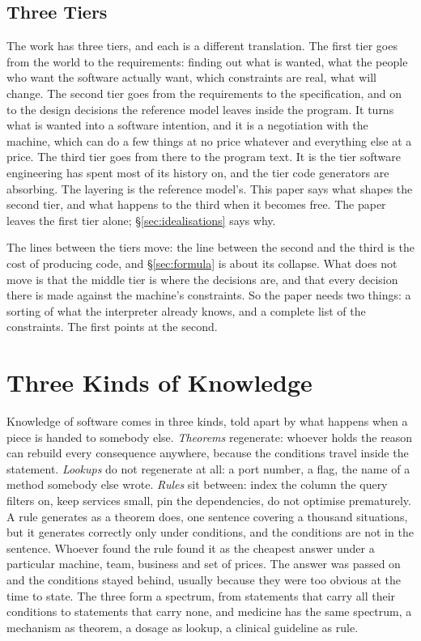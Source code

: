 \documentclass[11pt,oneside]{article}
\theoremstyle{definition}
\theoremstyle{remark}
\begin{document}
\subsection{Three Tiers}\label{sec:tiers}

The work has three tiers, and each is a different translation. The first tier goes from
the world to the requirements: finding out what is wanted, what the people who want the
software actually want, which constraints are real, what will change. The second tier goes
from the requirements to the specification, and on to the design decisions the reference
model leaves inside the program. It turns what is wanted into a software intention, and it
is a negotiation with the machine, which can do a few things at no price whatever and
everything else at a price. The third tier goes from there to the program text. It is the
tier software engineering has spent most of its history on, and the tier code generators
are absorbing. The layering is the reference model's. This paper says what shapes the
second tier, and what happens to the third when it becomes free. The paper leaves the
first tier alone; \S\ref{sec:idealisations} says why.

The lines between the tiers move: the line between the second and the third is the cost
of producing code, and \S\ref{sec:formula} is about its collapse. What does not move is that
the middle tier is where the decisions are, and that every decision there is made against
the machine's constraints. So the paper needs two things: a sorting of what the
interpreter already knows, and a complete list of the constraints. The first points at
the second.

\section{Three Kinds of Knowledge}\label{sec:knowledge}
Knowledge of software comes in three kinds, told apart by what happens when a piece is
handed to somebody else. \emph{Theorems} regenerate: whoever holds the reason can rebuild
every consequence anywhere, because the conditions travel inside the statement.
\emph{Lookups} do not regenerate at all: a port number, a flag, the name of a method
somebody else wrote. \emph{Rules} sit between: index the column the query filters on, keep
services small, pin the dependencies, do not optimise prematurely. A rule generates as a
theorem does, one sentence covering a thousand situations, but it generates correctly only
under conditions, and the conditions are not in the sentence. Whoever found the rule found
it as the cheapest answer under a particular machine, team, business and set of prices. The
answer was passed on and the conditions stayed behind, usually because they were too
obvious at the time to state. The three form a spectrum, from statements that carry all
their conditions to statements that carry none, and medicine has the same spectrum, a
mechanism as theorem, a dosage as lookup, a clinical guideline as rule.
\end{document}
